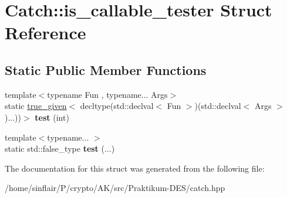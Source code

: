 \hypertarget{structCatch_1_1is__callable__tester}{}\section{Catch\+:\+:is\+\_\+callable\+\_\+tester Struct Reference}
\label{structCatch_1_1is__callable__tester}
\subsection*{Static Public Member Functions}
\begin{DoxyCompactItemize}
\item 
\mbox{\label{structCatch_1_1is__callable__tester_a91c513c4fc18b01b96fa0132706f34b3}} 
{\footnotesize template$<$typename Fun , typename... Args$>$ }\\static \hyperlink{structCatch_1_1true__given}{true\+\_\+given}$<$ decltype(std\+::declval$<$ Fun $>$)(std\+::declval$<$ Args $>$)...))$>$ {\bfseries test} (int)
\item 
\mbox{\label{structCatch_1_1is__callable__tester_adce16c4accb860bf46f6491dd70cfd63}} 
{\footnotesize template$<$typename... $>$ }\\static std\+::false\+\_\+type {\bfseries test} (...)
\end{DoxyCompactItemize}


The documentation for this struct was generated from the following file\+:\begin{DoxyCompactItemize}
\item 
/home/sinflair/\+P/crypto/\+A\+K/src/\+Praktikum-\/\+D\+E\+S/catch.\+hpp\end{DoxyCompactItemize}
